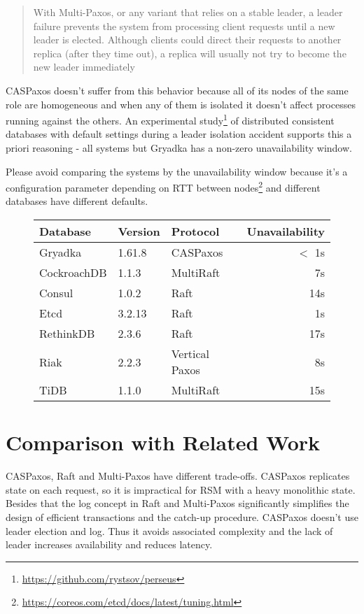 \documentclass[12pt]{article}
\theoremstyle{definition}
\begin{document}
\begin{quote}
  With Multi-Paxos, or any variant that relies on a stable leader, a leader failure prevents the system from processing client requests until a new leader is elected. Although clients could direct their requests to another replica (after they time out), a replica will usually not try to become the new leader immediately
\end{quote}

CASPaxos doesn't suffer from this behavior because all of its nodes of the same role are homogeneous and when any of them is isolated it doesn't affect processes running against the others. An experimental study\footnote{\href{https://github.com/rystsov/perseus}{https://github.com/rystsov/perseus}} of distributed consistent databases with default settings during a leader isolation accident supports this a priori reasoning - all systems but Gryadka has a non-zero unavailability window.

Please avoid comparing the systems by the unavailability window because it's a configuration parameter depending on RTT between nodes\footnote{\href{https://coreos.com/etcd/docs/latest/tuning.html}{https://coreos.com/etcd/docs/latest/tuning.html}} and different databases have different defaults.

\begin{figure}[!h]
  \centering
  \begin{tabular}{|l|l|l|r|}
  \hline
  Database & Version & Protocol & Unavailability\\
  \hline
  \hline
  Gryadka & 1.61.8 & CASPaxos & $<$ 1s\\
  \hline
  CockroachDB & 1.1.3 & MultiRaft & 7s\\
  Consul & 1.0.2 & Raft & 14s\\
  Etcd & 3.2.13 & Raft & 1s\\
  RethinkDB & 2.3.6 & Raft & 17s\\
  Riak & 2.2.3 & Vertical Paxos & 8s\\
  TiDB & 1.1.0 & MultiRaft & 15s\\
  \hline
  \end{tabular}
\end{figure}

\newpage

\section{Comparison with Related Work}

CASPaxos, Raft\cite{raft} and Multi-Paxos have different trade-offs. CASPaxos replicates state on each request, so it is impractical for RSM with a heavy monolithic state. Besides that the log concept in Raft and Multi-Paxos significantly simplifies the design of efficient transactions and the catch-up procedure. CASPaxos doesn't use leader election and log. Thus it avoids associated complexity and the lack of leader increases availability and reduces latency.
\end{document}
